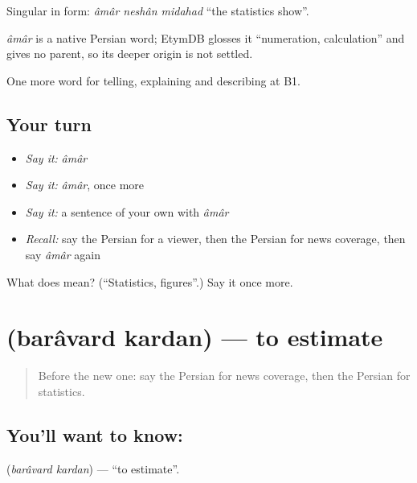 Singular in form: \emph{âmâr neshân midahad} \textquotedblleft{}the statistics show\textquotedblright{}.

\begin{cousinweb}
\emph{âmâr} is a native Persian word; EtymDB glosses it \textquotedblleft{}numeration, calculation\textquotedblright{} and gives no parent, so its deeper origin is not settled.
\end{cousinweb}

\begin{grammarlens}[title={What you've built}]
One more word for telling, explaining and describing at B1.
\end{grammarlens}

\subsection*{Your turn}
\begin{itemize}
\raggedright
  \item \emph{Say it:} \emph{âmâr}
  \item \emph{Say it:} \emph{âmâr}, once more
  \item \emph{Say it:} a sentence of your own with \emph{âmâr}
  \item \emph{Recall:} say the Persian for a viewer, then the Persian for news coverage, then say \emph{âmâr} again
\end{itemize}

\begin{tcolorbox}[breakable,colback=teal!4,colframe=teal!35!black,title={Before you move on}]
What does  mean? (\textquotedblleft{}Statistics, figures\textquotedblright{}.) Say it once more.
\end{tcolorbox}
\section[\texorpdfstring{\fa{برآورد} \fa{کردن} (barâvard kardan)}{برآورد کردن (barâvard kardan)}]{  (barâvard kardan) — to estimate}

\label{lesson:FA-C313-baravard-kardan}



\begin{quote}
Before the new one: say the Persian for news coverage, then the Persian for statistics.
\end{quote}

\subsection*{You'll want to know:  }
\textbf{ } (\emph{barâvard kardan}) — \textquotedblleft{}to estimate\textquotedblright{}.

